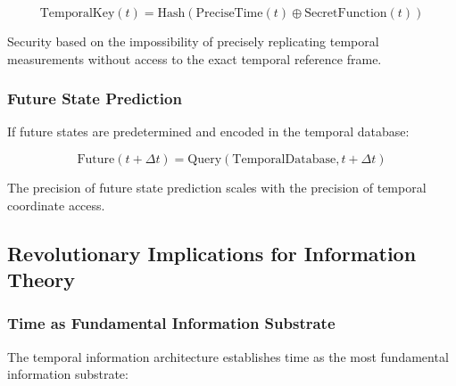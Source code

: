 \documentclass[12pt,a4paper]{article}
\begin{document}
{\begin{equation}
\text{TemporalKey}(t) = \text{Hash}(\text{PreciseTime}(t) \oplus \text{SecretFunction}(t))
\end{equation}

Security based on the impossibility of precisely replicating temporal measurements without access to the exact temporal reference frame.

\subsubsection{Future State Prediction}

If future states are predetermined and encoded in the temporal database:

\begin{equation}
\text{Future}(t + \Delta t) = \text{Query}(\text{TemporalDatabase}, t + \Delta t)
\end{equation}

The precision of future state prediction scales with the precision of temporal coordinate access.

\subsection{Revolutionary Implications for Information Theory}

\subsubsection{Time as Fundamental Information Substrate}

The temporal information architecture establishes time as the most fundamental information substrate:

\begin{figure}[H]
\centering
{}
\end{figure}}
\end{document}
